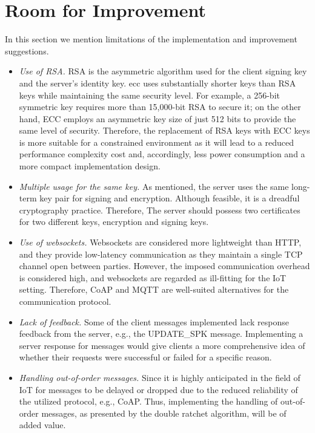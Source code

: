 \section{Room for Improvement}
In this section we mention limitations of the implementation and improvement suggestions.
\begin{itemize}
	\item \textit{Use of RSA.} RSA is the asymmetric algorithm used for the client signing key and the server's identity key. \gls{ecc} uses substantially shorter keys than RSA keys while maintaining the same security level. For example, a 256-bit symmetric key requires more than 15,000-bit RSA to secure it; on the other hand, ECC employs an asymmetric key size of just 512 bits to provide the same level of security. Therefore, the replacement of RSA keys with ECC keys is more suitable for a constrained environment as it will lead to a reduced performance complexity cost and, accordingly, less power consumption and a more compact implementation design.
	\item \textit{Multiple usage for the same key.} As mentioned, the server uses the same long-term key pair for signing and encryption. Although feasible, it is a dreadful cryptography practice. Therefore, The server should possess two certificates for two different keys, encryption and signing keys.
	\item \textit{Use of websockets.} Websockets are considered more lightweight than HTTP, and they provide low-latency communication as they maintain a single TCP channel open between parties. However, the imposed communication overhead is considered high, and websockets are regarded as ill-fitting for the IoT setting. Therefore, CoAP and MQTT are well-suited alternatives for the communication protocol.
	\item \textit{Lack of feedback.} Some of the client messages implemented lack response feedback from the server, e.g., the UPDATE\_SPK message. Implementing a server response for messages would give clients a more comprehensive idea of whether their requests were successful or failed for a specific reason.
	\item \textit{Handling out-of-order messages.} Since it is highly anticipated in the field of IoT for messages to be delayed or dropped due to the reduced reliability of the utilized protocol, e.g., CoAP. Thus, implementing the handling of out-of-order messages, as presented by the double ratchet algorithm, will be of added value. 
\end{itemize}


